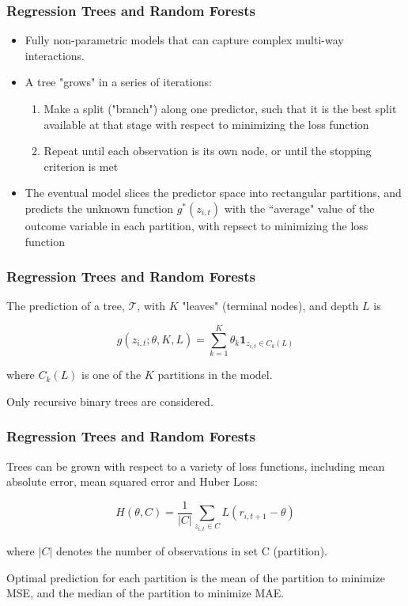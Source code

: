 \documentclass[]{beamer}
\begin{document}

\begin{frame}
\frametitle{Regression Trees and Random Forests}
\begin{itemize}
	\item Fully non-parametric models that can capture complex multi-way interactions. 
	\item A tree "grows" in a series of iterations:
	\begin{enumerate}
		\item Make a split ("branch") along one predictor, such that it is the best split available at that stage with respect to minimizing the loss function
		\item Repeat until each observation is its own node, or until the stopping criterion is met
	\end{enumerate}
	\item The eventual model slices the predictor space into rectangular partitions, and predicts the unknown function $g^*(z_{i,t})$ with the ``average" value of the outcome variable in each partition, with repsect to minimizing the loss function	
\end{itemize}
\end{frame}

\begin{frame}
\frametitle{Regression Trees and Random Forests}
The prediction of a tree, $\mathcal{T}$, with \(K\) "leaves" (terminal nodes), and depth $L$ is

\begin{equation}
g(z_{i,t};\theta,K,L) = \sum_{k=1}^{K}\theta_k\textbf{1}_{z_{i,t}\in C_k(L)}
\end{equation}

where $C_k(L)$ is one of the $K$ partitions in the model.

Only recursive binary trees are considered. 

\end{frame}

\begin{frame}
\frametitle{Regression Trees and Random Forests}
Trees can be grown with respect to a variety of loss functions, including mean absolute error, mean squared error and Huber Loss:

\begin{equation}
H(\theta, C) = \frac{1}{|C|} \sum_{z_{i,t} \in C} L(r_{i,t+1} - \theta)
\end{equation}

where $|C|$ denotes the number of observations in set C (partition). 

Optimal prediction for each partition is the mean of the partition to minimize MSE, and the median of the partition to minimize MAE.
\end{frame}
\end{document}
